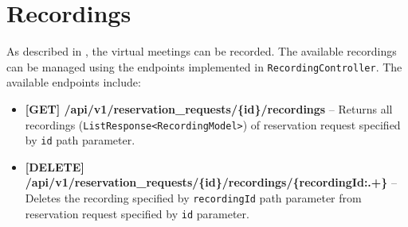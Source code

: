 \section{Recordings}
As described in , the virtual meetings can be recorded. The available recordings can be managed using the endpoints implemented in \texttt{RecordingController}. The available endpoints include:
\begin{itemize}
    \item \textbf{[GET] /api/v1/reservation\_requests/\{id\}/recordings} -- Returns all re\-cordings (\texttt{ListResponse<RecordingModel>}) of reservation request specified by \texttt{id} path parameter.
    \item \textbf{[DELETE] /api/v1/reservation\_requests/\{id\}/recordings/\{recordingId:.+\}} -- Deletes the recording specified by \texttt{recordingId} path parameter from reservation request specified by \texttt{id} parameter.
\end{itemize}
